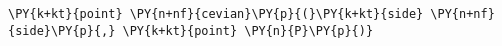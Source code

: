 \begin{Verbatim}[commandchars=\\\{\}]
    \PY{k+kt}{point} \PY{n+nf}{cevian}\PY{p}{(}\PY{k+kt}{side} \PY{n+nf}{side}\PY{p}{,} \PY{k+kt}{point} \PY{n}{P}\PY{p}{)}
\end{Verbatim}
